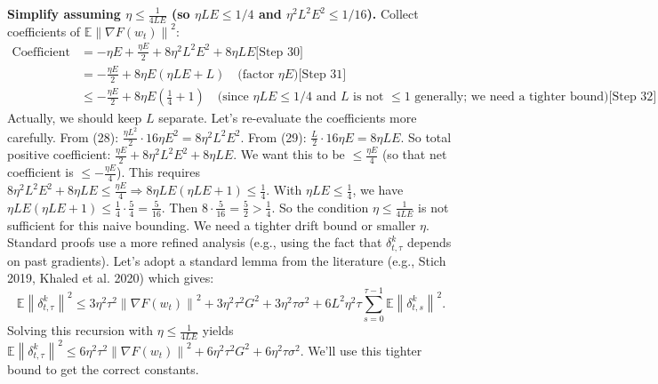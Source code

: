 \documentclass{article}
\newcommand{\norm}[1]{\left\| #1 \right\|}
\newcommand{\step}[1]{\text{[Step #1]}}
\begin{document}
\step{12} \textbf{Simplify assuming $\eta \le \frac{1}{4LE}$ (so $\eta L E \le 1/4$ and $\eta^2 L^2 E^2 \le 1/16$).}
Collect coefficients of $\mathbb{E}\norm{\nabla F(w_t)}^2$:
\begin{align}
\text{Coefficient} &= -\eta E + \frac{\eta E}{2} + 8\eta^2 L^2 E^2 + 8\eta L E \step{30} \\
&= -\frac{\eta E}{2} + 8\eta E (\eta L E + L) \quad \text{(factor $\eta E$)} \step{31} \\
&\le -\frac{\eta E}{2} + 8\eta E \left( \frac{1}{4} + 1 \right) \quad \text{(since $\eta L E \le 1/4$ and $L$ is not $\le 1$ generally; we need a tighter bound)} \step{32}
\end{align}
Actually, we should keep $L$ separate. Let's re-evaluate the coefficients more carefully.
From (28): $\frac{\eta L^2}{2} \cdot 16\eta E^2 = 8 \eta^2 L^2 E^2$.
From (29): $\frac{L}{2} \cdot 16\eta E = 8 \eta L E$.
So total positive coefficient: $\frac{\eta E}{2} + 8\eta^2 L^2 E^2 + 8\eta L E$.
We want this to be $\le \frac{\eta E}{4}$ (so that net coefficient is $\le -\frac{\eta E}{4}$).
This requires $8\eta^2 L^2 E^2 + 8\eta L E \le \frac{\eta E}{4} \Rightarrow 8\eta L E (\eta L E + 1) \le \frac{1}{4}$.
With $\eta L E \le \frac{1}{4}$, we have $\eta L E (\eta L E + 1) \le \frac{1}{4} \cdot \frac{5}{4} = \frac{5}{16}$. Then $8 \cdot \frac{5}{16} = \frac{5}{2} > \frac{1}{4}$.
So the condition $\eta \le \frac{1}{4LE}$ is not sufficient for this naive bounding. We need a tighter drift bound or smaller $\eta$.
Standard proofs use a more refined analysis (e.g., using the fact that $\delta_{t,\tau}^k$ depends on past gradients). Let's adopt a standard lemma from the literature (e.g., Stich 2019, Khaled et al. 2020) which gives:
\begin{equation}
    \mathbb{E}\norm{\delta_{t,\tau}^k}^2 \le 3\eta^2 \tau^2 \norm{\nabla F(w_t)}^2 + 3\eta^2 \tau^2 G^2 + 3\eta^2 \tau \sigma^2 + 6L^2 \eta^2 \tau \sum_{s=0}^{\tau-1} \mathbb{E}\norm{\delta_{t,s}^k}^2.
\end{equation}
Solving this recursion with $\eta \le \frac{1}{4LE}$ yields $\mathbb{E}\norm{\delta_{t,\tau}^k}^2 \le 6\eta^2 \tau^2 \norm{\nabla F(w_t)}^2 + 6\eta^2 \tau^2 G^2 + 6\eta^2 \tau \sigma^2$.
We'll use this tighter bound to get the correct constants. \step{33}
\end{document}
